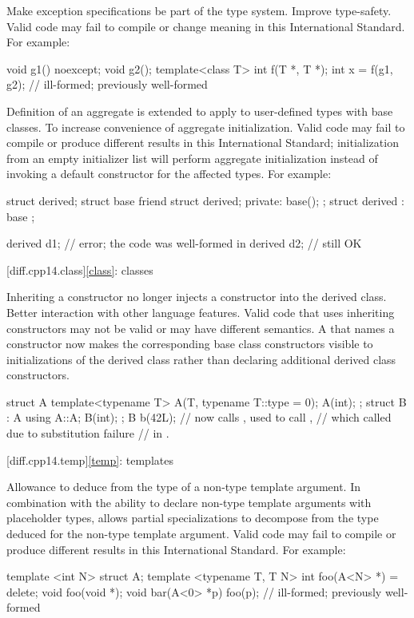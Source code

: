\change Make exception specifications be part of the type system.
\rationale Improve type-safety.
\effect
Valid \CppXIV{} code may fail to compile or change meaning in this
International Standard.
For example:

\begin{codeblock}
void g1() noexcept;
void g2();
template<class T> int f(T *, T *);
int x = f(g1, g2);    // ill-formed; previously well-formed
\end{codeblock}

\change Definition of an aggregate is extended
to apply to user-defined types with base classes.
\rationale To increase convenience of aggregate initialization.
\effect
Valid \CppXIV{} code may fail to compile or produce different results in this
International Standard; initialization from an empty initializer list will
perform aggregate initialization instead of invoking a default constructor
for the affected types.
For example:
\begin{codeblock}
struct derived;
struct base {
  friend struct derived;
private:
  base();
};
struct derived : base {};

derived d1{};       // error; the code was well-formed in \CppXIV{}
derived d2;         // still OK
\end{codeblock}

[diff.cpp14.class]{\ref{class}: classes}

\change
Inheriting a constructor no longer injects a constructor into the derived class.
\rationale
Better interaction with other language features.
\effect
Valid \CppXIV{} code that uses inheriting constructors may not be valid
or may have different semantics. A 
that names a constructor now makes the corresponding base class constructors
visible to initializations of the derived class
rather than declaring additional derived class constructors.
\begin{codeblock}
struct A {
  template<typename T> A(T, typename T::type = 0);
  A(int);
};
struct B : A {
  using A::A;
  B(int);
};
B b(42L); // now calls , used to call ,
          // which called  due to substitution failure
          // in .
\end{codeblock}

[diff.cpp14.temp]{\ref{temp}: templates}

\change Allowance to deduce from the type of a non-type template argument.
\rationale In combination with the ability to declare
non-type template arguments with placeholder types,
allows partial specializations to decompose
from the type deduced for the non-type template argument.
\effect Valid \CppXIV{} code may fail to compile
or produce different results in this International Standard.
For example:
\begin{codeblock}
template <int N> struct A;
template <typename T, T N> int foo(A<N> *) = delete;
void foo(void *);
void bar(A<0> *p) {
  foo(p); // ill-formed; previously well-formed
}
\end{codeblock}

